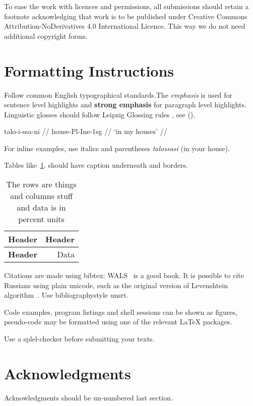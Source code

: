 \documentclass[b5paper]{article}
\begin{document}
To ease the work with licences and permissions, all submissions should retain
a footnote acknowledging that work is to be published under Creative
Commons Attribution-NoDerivatives 4.0 International Licence. This way we do not
need additional copyright forms.

\section{Formatting Instructions}

Follow common English typographical standards.The \emph{emphasis} is used for
sentence level highlights and \textbf{strong emphasis} for paragraph level
highlights. Linguistic glosses should follow Leipzig Glossing rules
\url{}, see (\nextx).

\ex
\begingl
\gla talo-i-ssa-ni //
\glb house-{\sc Pl}-{\sc Ine}-{\sc 1sg} //
\glft `in my houses' //
\endgl
\xe

For inline examples, use italics and parentheses \emph{talossasi} (in your
house).

Tables like~\ref{table:example}. should have caption underneath and borders.

\begin{table}
    \center
    \begin{tabular}{|l|r|}
        \hline
        \bf Header & \bf Header \\
        \hline
        \bf Header & Data \\
        \hline
    \end{tabular}
    \caption{The rows are things and columns stuff and data is in percent units
    \label{table:example}}
\end{table}

Citations are made using bibtex: WALS~\cite{haspelmath2005world} is a good book.
It is possible to cite Russians using plain unicode, such as the original 
version of Levenshtein algorithm~\cite{levenshtein1965}.
Use bibliographystyle unsrt.

Code examples, program listings and shell sessions can be shown as figures,
pseudo-code may be formatted using one of the relevant \LaTeX{} packages.

Use a splel-checker before submitting your texts.

\section*{Acknowledgments}

Acknowledgments should be un-numbered last section.



\end{document}
